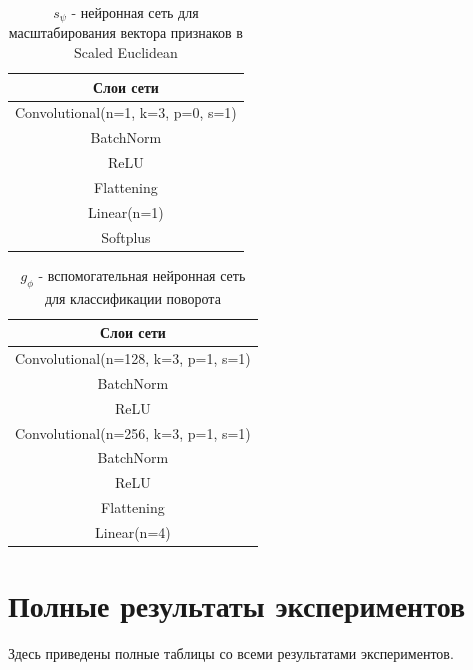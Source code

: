 \documentclass[a4paper, 12pt]{report}
\begin{document}
\begin{table}[H]
\begin{adjustbox}{center}
\begin{tabular}{| c | }
\hline
Слои сети \\
\hline
Convolutional(n=1, k=3, p=0, s=1) \\
\hline
BatchNorm \\
\hline
ReLU \\
\hline
Flattening \\
\hline
Linear(n=1) \\
\hline
Softplus \\
\hline
\end{tabular}
\end{adjustbox}
\caption{\centering $s_{\psi}$ - нейронная сеть для масштабирования вектора признаков в Scaled Euclidean \cite{dfmn}}
\end{table}

\begin{table}[H]
\begin{adjustbox}{center}
\begin{tabular}{| c | }
\hline
Слои сети \\
\hline
Convolutional(n=128, k=3, p=1, s=1) \\
\hline
BatchNorm \\
\hline
ReLU \\
\hline
Convolutional(n=256, k=3, p=1, s=1) \\
\hline
BatchNorm \\
\hline
ReLU \\
\hline
Flattening \\
\hline
Linear(n=4) \\
\hline
\end{tabular}
\end{adjustbox}
\caption{\centering $g_{\phi}$ - вспомогательная нейронная сеть для классификации поворота \cite{rotation}}
\end{table}
\newpage
\section {Полные результаты экспериментов}

Здесь приведены полные таблицы со всеми результатами экспериментов.
\end{document}
